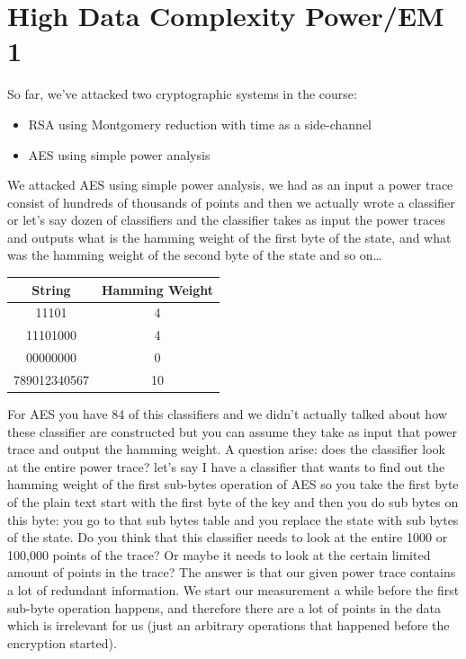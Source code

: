 \chapter{High Data Complexity Power/EM 1}\label{cha:High Data Complexity Power/EM 1}
So far, we've attacked two cryptographic systems in the course:
\begin{itemize}
\item RSA using Montgomery reduction with time as a side-channel
\item AES using simple power analysis
\end{itemize}
We attacked AES using simple power analysis, we had as an input a power trace consist of hundreds of thousands of points and then we actually wrote a classifier or let’s say dozen of classifiers and the classifier takes as input the power traces and outputs what is the hamming weight of the first byte of the state, and what was the hamming weight of the second byte of the state and so on… 
\newpage
\begin{center}
\begin{tabular}{ | c c | }
\hline
String & Hamming Weight \\ 
 \hline
 11101 & 4 \\ 
 \hline
 11101000 & 4 \\
 \hline
 00000000 & 0 \\
 \hline
 789012340567 & 10 \\
 \hline
\end{tabular}
\end{center}
\label{hammingWeights}
\newline

For AES you have 84 of this classifiers and we didn't actually talked about how these classifier are constructed but you can assume they take as input that power trace and output the hamming weight. 
\newline
A question arise: does the classifier look at the entire power trace? let’s say I have a classifier that wants to find out the hamming weight of the first sub-bytes operation of AES so you take the first byte of the plain text start with the first byte of the key and then you do sub bytes on this byte: you go to that sub bytes table and you replace the state with sub bytes of the state. 
Do you think that this classifier needs to look at the entire 1000 or 100,000 points of the trace? Or maybe it needs to look at the certain limited amount of points in the trace?
The answer is that our given power trace contains a lot of redundant information. We start our measurement a while before the first sub-byte operation happens, and therefore there are a lot of points in the data which is irrelevant for us (just an arbitrary operations that happened before the encryption started).

